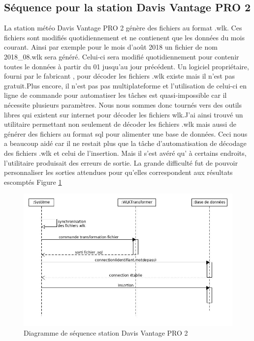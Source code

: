 \subsection{Séquence pour la station Davis Vantage PRO 2} 
La station météo Davis Vantage PRO 2 génère des fichiers au format .wlk. Ces fichiers sont modifiés quotidiennement et ne contienent que les données du mois courant. Ainsi par exemple pour le mois d’août 2018 un fichier de nom 2018\_08.wlk sera généré. Celui-ci sera modifié quotidiennement pour contenir toutes le données à partir du 01 jusqu’au jour précédent. Un logiciel propriétaire, fourni par le fabricant , pour décoder les fichiers .wlk existe mais il n’est pas gratuit.Plus encore, il n’est pas pas multiplateforme et l’utilisation de celui-ci en ligne de commande pour automatiser les tâches est quasi-impossible car il nécessite plusieurs paramètres. Nous nous sommes donc tournés vers des outils libres qui existent sur internet pour décoder les fichiers wlk.J'ai ainsi trouvé un utilitaire permettant non seulement de décoder les fichiers .wlk mais aussi de générer des fichiers au format sql pour alimenter une base de données. Ceci nous a beaucoup aidé car il ne restait plus que la tâche d'automatisation  de décodage des fichiers .wlk et celui de l’insertion. Mais il s’est avéré qu' à certains endroits, l’utilitaire produisait des erreurs de sortie. La grande difficulté fut de pouvoir personnaliser les sorties attendues pour qu’elles correspondent aux résultats escomptés Figure \ref{fig : Diagramme de séquence station davis}

\begin{figure}[!h]
    
    \centering
     \includegraphics[width=.7\textwidth]{images/davis_senquence_diagrame.jpg}
     \caption{ Diagramme de séquence station  Davis Vantage PRO 2}
     \label{fig : Diagramme de séquence station davis}
\end{figure}


